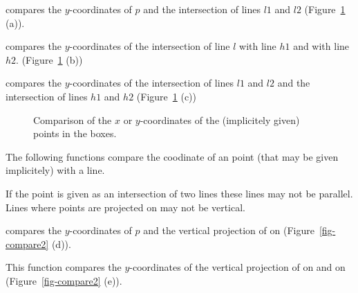 	{compares the $y$-coordinates of $p$ and the intersection of lines
         $l1$ and $l2$ (Figure~\ref{fig-compare} (a)).}


	{compares the $y$-coordinates of the intersection of line $l$
         with line $h1$ and with line $h2$. (Figure~\ref{fig-compare} (b))}


	{compares the $y$-coordinates of the intersection of lines $l1$
         and $l2$ and  the intersection of lines $h1$ and $h2$ 
	(Figure~\ref{fig-compare} (c))}


\begin{figure}[h]
\centerline{}
\caption{Comparison of the $x$ or $y$-coordinates of the (implicitely
given) points in the boxes.\label{fig-compare}}
\end{figure} 


The following functions compare the  coodinate of an point
(that may be given implicitely) with a line. 

\precond If the point is given as an intersection of two lines these
lines may not be parallel. Lines where points are projected on may not be
vertical.

        {compares the $y$-coordinates of $p$ and the vertical projection
         of  on  (Figure~\ref{fig-compare2} (d)).}


{This function compares the $y$-coordinates of the vertical projection 
 of  on  and on  (Figure~\ref{fig-compare2} (e)).}

